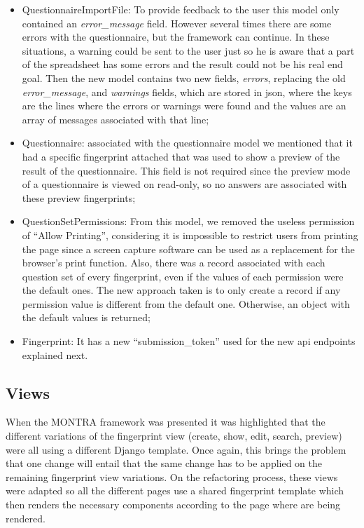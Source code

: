 \begin{itemize}
    \item QuestionnaireImportFile: To provide feedback to the user this model only contained an \textit{error\_message} field.
        However several times there are some errors with the questionnaire, but the framework can continue.
        In these situations, a warning could be sent to the user just so he is aware that a part of the spreadsheet has some errors and the result could not be his real end goal.
        Then the new model contains two new fields, \textit{errors}, replacing the old \textit{error\_message}, and \textit{warnings} fields, which are stored in \gls{json}, where the keys are the lines where the errors or warnings were found and the values are an array of messages associated with that line;
    \item Questionnaire: associated with the questionnaire model we mentioned that it had a specific fingerprint attached that was used to show a preview of the result of the questionnaire.
        This field is not required since the preview mode of a questionnaire is viewed on read-only, so no answers are associated with these preview fingerprints;
    \item QuestionSetPermissions: From this model, we removed the useless permission of ``Allow Printing'', considering it is impossible to restrict users from printing the page since a screen capture software can be used as a replacement for the browser's print function.
        Also, there was a record associated with each question set of every fingerprint, even if the values of each permission were the default ones.
        The new approach taken is to only create a record if any permission value is different from the default one.
        Otherwise, an object with the default values is returned;
    \item Fingerprint: It has a new ``submission\_token'' used for the new \gls{api} endpoints explained next.
\end{itemize}

\subsection{Views}

When the MONTRA framework was presented it was highlighted that the different variations of the fingerprint view (create, show, edit, search, preview) were all using a different Django template.
Once again, this brings the problem that one change will entail that the same change has to be applied on the remaining fingerprint view variations.
On the refactoring process, these views were adapted so all the different pages use a shared fingerprint template which then renders the necessary components according to the page where are being rendered.

